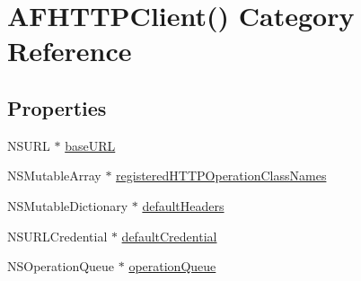 \hypertarget{category_a_f_h_t_t_p_client_07_08}{\section{A\-F\-H\-T\-T\-P\-Client() Category Reference}
\label{category_a_f_h_t_t_p_client_07_08}
}
\subsection*{Properties}
\begin{DoxyCompactItemize}
\item 
N\-S\-U\-R\-L $\ast$ \hyperlink{category_a_f_h_t_t_p_client_07_08_a4cd16d7ba17cde32dff6561efc9e91d6}{base\-U\-R\-L}
\item 
N\-S\-Mutable\-Array $\ast$ \hyperlink{category_a_f_h_t_t_p_client_07_08_afa70d79a30e43329c545f47f508e6bf6}{registered\-H\-T\-T\-P\-Operation\-Class\-Names}
\item 
N\-S\-Mutable\-Dictionary $\ast$ \hyperlink{category_a_f_h_t_t_p_client_07_08_a8a13f725b6288e31350683e086e1af19}{default\-Headers}
\item 
N\-S\-U\-R\-L\-Credential $\ast$ \hyperlink{category_a_f_h_t_t_p_client_07_08_ae4cf23a4e54b4de7281d825ce2cabd59}{default\-Credential}
\item 
N\-S\-Operation\-Queue $\ast$ \hyperlink{category_a_f_h_t_t_p_client_07_08_a5446c3e9cf56c6a77cf3975a7ab25801}{operation\-Queue}
\end{DoxyCompactItemize}


